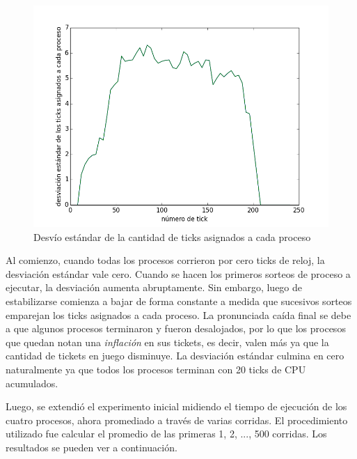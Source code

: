 \documentclass[a4paper]{article}
\begin{document}
\begin{figure}[H]
\centering
\includegraphics[scale=0.66]{../experimentacion/ej9-fairness/fairness/plot.png}
\caption{Desvío estándar de la cantidad de ticks asignados a cada proceso}
\end{figure}

Al comienzo, cuando todas los procesos corrieron por cero ticks de reloj, la desviación estándar vale cero. Cuando se hacen los primeros sorteos de proceso a ejecutar, la desviación aumenta abruptamente. Sin embargo, luego de estabilizarse comienza a bajar de forma constante a medida que sucesivos sorteos emparejan los ticks asignados a cada proceso. La pronunciada caída final se debe a que algunos procesos terminaron y fueron desalojados, por lo que los procesos que quedan notan una \textit{inflación} en sus tickets, es decir, valen más ya que la cantidad de tickets en juego disminuye. La desviación estándar culmina en cero naturalmente ya que todos los procesos terminan con 20 ticks de CPU acumulados.

Luego, se extendió el experimento inicial midiendo el tiempo de ejecución de los cuatro procesos, ahora promediado a través de varias corridas. El procedimiento utilizado fue calcular el promedio de las primeras 1, 2, ..., 500 corridas. Los resultados se pueden ver a continuación.
\end{document}
